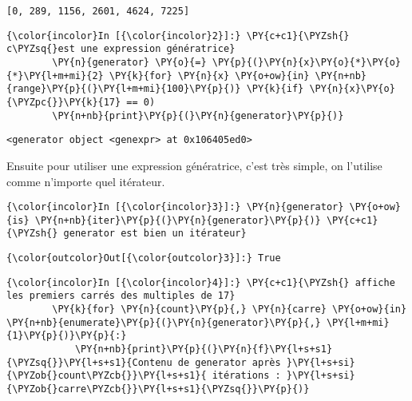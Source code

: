     \begin{Verbatim}[commandchars=\\\{\}]
[0, 289, 1156, 2601, 4624, 7225]

    \end{Verbatim}

    \begin{Verbatim}[commandchars=\\\{\}]
{\color{incolor}In [{\color{incolor}2}]:} \PY{c+c1}{\PYZsh{} c\PYZsq{}est une expression génératrice}
        \PY{n}{generator} \PY{o}{=} \PY{p}{(}\PY{n}{x}\PY{o}{*}\PY{o}{*}\PY{l+m+mi}{2} \PY{k}{for} \PY{n}{x} \PY{o+ow}{in} \PY{n+nb}{range}\PY{p}{(}\PY{l+m+mi}{100}\PY{p}{)} \PY{k}{if} \PY{n}{x}\PY{o}{\PYZpc{}}\PY{k}{17} == 0) 
        \PY{n+nb}{print}\PY{p}{(}\PY{n}{generator}\PY{p}{)}
\end{Verbatim}


    \begin{Verbatim}[commandchars=\\\{\}]
<generator object <genexpr> at 0x106405ed0>

    \end{Verbatim}

    Ensuite pour utiliser une expression génératrice, c'est très simple, on
l'utilise comme n'importe quel itérateur.

    \begin{Verbatim}[commandchars=\\\{\}]
{\color{incolor}In [{\color{incolor}3}]:} \PY{n}{generator} \PY{o+ow}{is} \PY{n+nb}{iter}\PY{p}{(}\PY{n}{generator}\PY{p}{)} \PY{c+c1}{\PYZsh{} generator est bien un itérateur}
\end{Verbatim}


\begin{Verbatim}[commandchars=\\\{\}]
{\color{outcolor}Out[{\color{outcolor}3}]:} True
\end{Verbatim}
            
    \begin{Verbatim}[commandchars=\\\{\}]
{\color{incolor}In [{\color{incolor}4}]:} \PY{c+c1}{\PYZsh{} affiche les premiers carrés des multiples de 17}
        \PY{k}{for} \PY{n}{count}\PY{p}{,} \PY{n}{carre} \PY{o+ow}{in} \PY{n+nb}{enumerate}\PY{p}{(}\PY{n}{generator}\PY{p}{,} \PY{l+m+mi}{1}\PY{p}{)}\PY{p}{:}
            \PY{n+nb}{print}\PY{p}{(}\PY{n}{f}\PY{l+s+s1}{\PYZsq{}}\PY{l+s+s1}{Contenu de generator après }\PY{l+s+si}{\PYZob{}count\PYZcb{}}\PY{l+s+s1}{ itérations : }\PY{l+s+si}{\PYZob{}carre\PYZcb{}}\PY{l+s+s1}{\PYZsq{}}\PY{p}{)}
\end{Verbatim}


